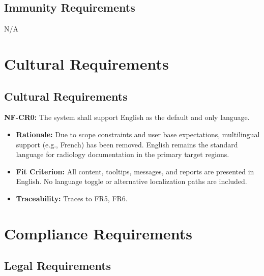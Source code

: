 \documentclass[12pt]{article}
\begin{document}
\subsection{Immunity Requirements}
N/A


\section{Cultural Requirements}


\subsection{Cultural Requirements}

\textbf{NF-CR0:} The system shall support English as the default and only language.
\begin{itemize}
    \item \textbf{Rationale:} Due to scope constraints and user base expectations, multilingual support (e.g., French) has been removed. English remains the standard language for radiology documentation in the primary target regions.
    \item \textbf{Fit Criterion:} All content, tooltips, messages, and reports are presented in English. No language toggle or alternative localization paths are included.
    \item \textbf{Traceability:} Traces to FR5, FR6.
\end{itemize}


\section{Compliance Requirements}


\subsection{Legal Requirements}
\end{document}
